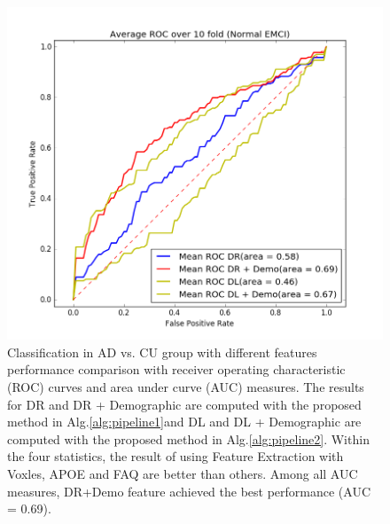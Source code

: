 \begin{figure}[h]
	\centering
	\includegraphics[width=\linewidth]{figures/CU_EMCI}
	\caption[ROC for Normal vs. EMCI]{Classification in AD vs. CU group with different features performance comparison with receiver operating characteristic (ROC) curves and area under curve (AUC) measures. The results for DR and DR + Demographic are computed with the proposed method in Alg.\ref{alg:pipeline1}and DL and DL + Demographic are computed with the proposed method in Alg.\ref{alg:pipeline2}. Within the four statistics, the result of using Feature Extraction with Voxles, APOE and FAQ are better than others. Among all AUC measures, DR+Demo feature achieved the best performance (AUC = 0.69).}
	\label{fig:cuemci}
\end{figure}
